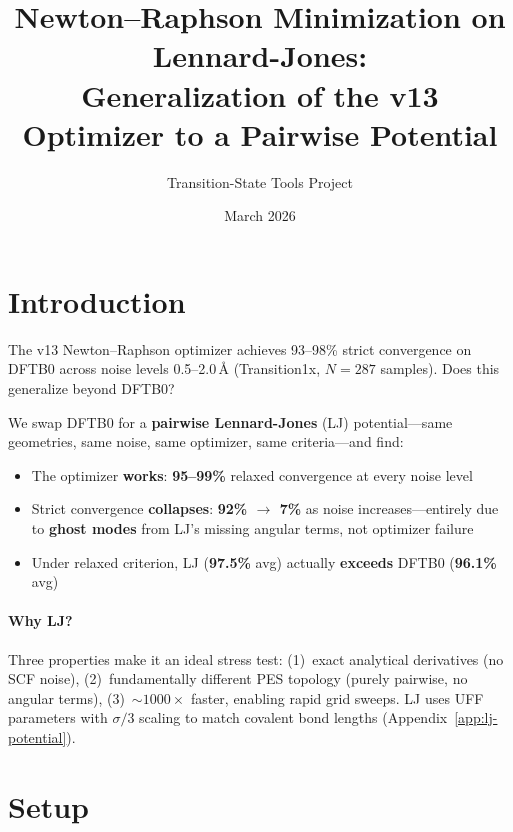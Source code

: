 \documentclass[11pt,a4paper]{article}
\title{Newton--Raphson Minimization on Lennard-Jones:\\
  Generalization of the v13 Optimizer to a Pairwise Potential}
\author{Transition-State Tools Project}
\date{March 2026}
\newcommand{\hlnum}[1]{{\Large\bfseries\color{ljblue}#1}}
\newcommand{\hldftb}[1]{{\large\bfseries\color{dftborange}#1}}
\theoremstyle{definition}
\begin{document}
\maketitle

\section{Introduction}

The v13 Newton--Raphson optimizer achieves 93--98\% strict convergence on
DFTB0 across noise levels 0.5--2.0\,\AA{} (Transition1x, $N{=}287$
samples).  Does this generalize beyond DFTB0?

We swap DFTB0 for a \textbf{pairwise Lennard-Jones} (LJ) potential---same
geometries, same noise, same optimizer, same criteria---and find:

\begin{tcolorbox}[keyresult, title=Central Result]
\begin{itemize}[nosep,leftmargin=*]
  \item The optimizer \textbf{works}: \hlnum{95--99\%} relaxed convergence
    at every noise level
  \item Strict convergence \textbf{collapses}: \hlnum{92\% $\to$ 7\%} as
    noise increases---entirely due to \textbf{ghost modes} from LJ's
    missing angular terms, not optimizer failure
  \item Under relaxed criterion, LJ (\hlnum{97.5\%} avg) actually
    \textbf{exceeds} DFTB0 (\hldftb{96.1\%} avg)
\end{itemize}
\end{tcolorbox}

\paragraph{Why LJ?}  Three properties make it an ideal stress test:
(1)~exact analytical derivatives (no SCF noise),
(2)~fundamentally different PES topology (purely pairwise, no angular terms),
(3)~${\sim}1000\times$ faster, enabling rapid grid sweeps.
LJ uses UFF parameters with $\sigma/3$ scaling to match covalent bond
lengths (Appendix~\ref{app:lj-potential}).

\section{Setup}
\label{sec:setup}
\end{document}
